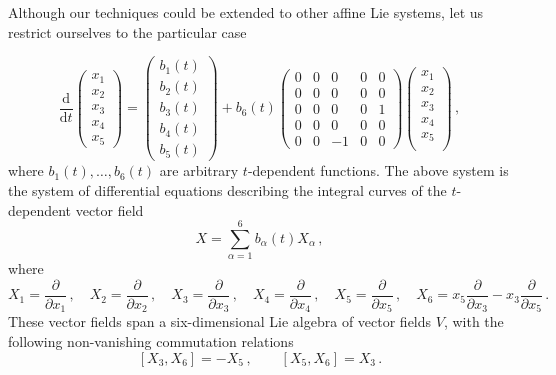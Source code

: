 \documentclass[11pt]{article}
\theoremstyle{plain}
\theoremstyle{definition}
\renewcommand{\d}{\mathrm{d}}
\def\d{\mathrm{d}}
\numberwithin{equation}{section}
\begin{document}
Although our techniques could be extended to other affine Lie systems, let us restrict ourselves to the particular case 

\begin{equation}\label{eq:AffineLiekpoly}
\frac{\d}{\d t}
\begin{pmatrix}
    x_1\\
    x_2\\
    x_3\\
    x_4\\
    x_5
\end{pmatrix}=
\begin{pmatrix}
    b_1(t)\\
    b_2(t)\\
    b_3(t)\\
    b_4(t)\\
    b_5(t)
\end{pmatrix}+b_6(t)
\begin{pmatrix}
    0&0&0&0&0\\
    0&0&0&0&0\\
    0&0&0&0&1\\
    0&0&0&0&0\\
    0&0&-1&0&0
\end{pmatrix}
\begin{pmatrix}
    x_1\\
   x_2\\
    x_3\\
    x_4\\
    x_5\\
\end{pmatrix}\,,
\end{equation}
where $b_1(t),\ldots,b_6(t)$ are arbitrary $t$-dependent functions.
The above  system is the system of differential equations describing the integral curves of the $t$-dependent vector field
$$
X=\sum_{\alpha=1}^6b_\alpha(t)X_\alpha\,,
$$
where
\begin{equation*}
    X_1=\frac{\partial}{\partial x_1}\,,\quad X_2=\frac{\partial}{\partial x_2}\,,\quad
    X_3=\frac{\partial }{\partial x_3}\,,\quad
    X_4=\frac{\partial}{\partial x_4}\,,\quad 
    X_5=\frac{\partial}{\partial x_5}\,,\quad
    X_6=x_5\frac{\partial}{\partial x_3}-x_3\frac{\partial }{\partial x_5}\,.
\end{equation*}
These vector fields span a six-dimensional Lie algebra of vector fields $V$, with the following non-vanishing commutation relations
\begin{equation*}
[X_3,X_6]=-X_5\,,\qquad
[X_5,X_6]=X_3\,.
\end{equation*}
\end{document}
